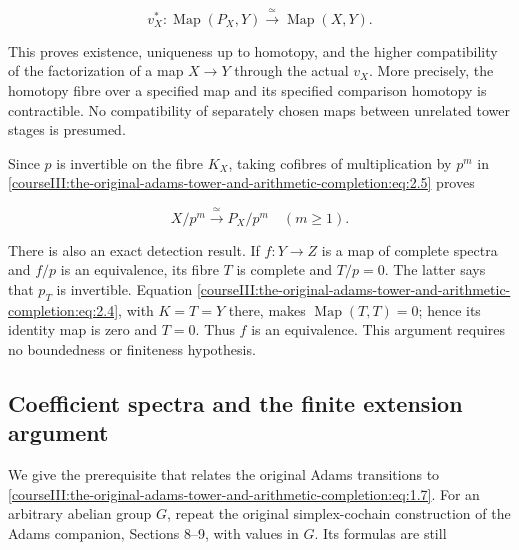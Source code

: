 \begin{equation}
v_X^*:\operatorname{Map}(P_X,Y)\xrightarrow{\ \simeq\ }\operatorname{Map}(X,Y).
\label{courseIII:the-original-adams-tower-and-arithmetic-completion:eq:2.6}
\end{equation}

This proves existence, uniqueness up to homotopy, and the higher compatibility of the factorization of a map \(X\to Y\) through the actual \(v_X\). More precisely, the homotopy fibre over a specified map and its specified comparison homotopy is contractible. No compatibility of separately chosen maps between unrelated tower stages is presumed.

Since \(p\) is invertible on the fibre \(K_X\), taking cofibres of multiplication by \(p^m\) in \eqref{courseIII:the-original-adams-tower-and-arithmetic-completion:eq:2.5} proves

\begin{equation}
X/p^m\xrightarrow{\ \simeq\ }P_X/p^m
\quad(m\geq1).
\label{courseIII:the-original-adams-tower-and-arithmetic-completion:eq:2.7}
\end{equation}

There is also an exact detection result. If \(f:Y\to Z\) is a map of complete spectra and \(f/p\) is an equivalence, its fibre \(T\) is complete and \(T/p=0\). The latter says that \(p_T\) is invertible. Equation \eqref{courseIII:the-original-adams-tower-and-arithmetic-completion:eq:2.4}, with \(K=T=Y\) there, makes \(\operatorname{Map}(T,T)=0\); hence its identity map is zero and \(T=0\). Thus \(f\) is an equivalence. This argument requires no boundedness or finiteness hypothesis.

\subsection{Coefficient spectra and the finite extension argument}
\label{courseIII:the-original-adams-tower-and-arithmetic-completion:arithmetic-extension-length}

\label{courseIII:the-original-adams-tower-and-arithmetic-completion:section-3}\label{courseIII:adams-arithmetic:3}

We give the prerequisite that relates the original Adams transitions to \eqref{courseIII:the-original-adams-tower-and-arithmetic-completion:eq:1.7}. For an arbitrary abelian group \(G\), repeat the original simplex-cochain construction of the Adams companion, Sections 8--9, with values in \(G\). Its formulas are still

